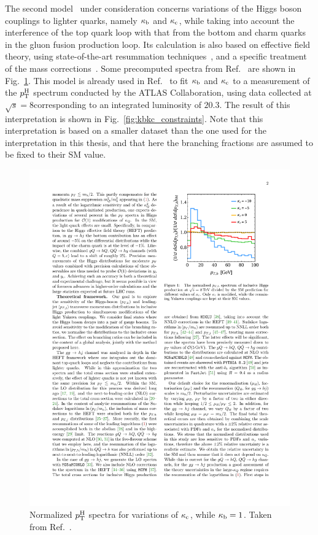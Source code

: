 The second model~\cite{Bishara:2016jga} under consideration concerns variations of the Higgs boson couplings to lighter quarks, namely $\kappa_{\mathrm{b}}$ and $\kappa_{\mathrm{c}}$, while taking into account the interference of the top quark loop with that from the bottom and charm quarks in the gluon fusion production loop.
% 
Its calculation is also based on effective field theory, using state-of-the-art resummation techniques~\cite{Bozzi:2003jy,Becher:2010tm,Mantler:2012bj,Grazzini:2013mca,Monni:2016ktx}, and a specific treatment of the mass corrections~\cite{Banfi:2013eda}.
% 
Some precomputed spectra from Ref.~\cite{Bishara:2016jga} are shown in Fig.~\ref{fig:kbkc-precomputed}.
% 
This model is already used in Ref.~\cite{Bishara:2016jga} to fit $\kappa_{\mathrm{b}}$ and $\kappa_{\mathrm{c}}$ to a measurement of the $p_\mathrm{T}^\mathrm{H}$ spectrum conducted by the ATLAS Collaboration, using data collected at $\sqrt{s}=8$\TeV corresponding to an integrated luminosity of $20.3$\fbinv.
% 
The result of this interpretation is shown in Fig.~\ref{fig:kbkc_constraints}.
% 
Note that this interpretation is based on a smaller dataset than the one used for the interpretation in this thesis, and that here the branching fractions are assumed to be fixed to their SM value.


\begin{figure}[hbtp]
  \begin{center}
    \includegraphics[width=0.6\linewidth]{img/theory/kbkc_variations.pdf}
    \caption{
        Normalized $p_\mathrm{T}^\mathrm{H}$ spectra for variations of $\kappa_{\mathrm{c}}$, while $\kappa_{\mathrm{b}}=1$.
        Taken from Ref.~\cite{Bishara:2016jga}.
        }
    \label{fig:kbkc-precomputed}
  \end{center}
\end{figure}

